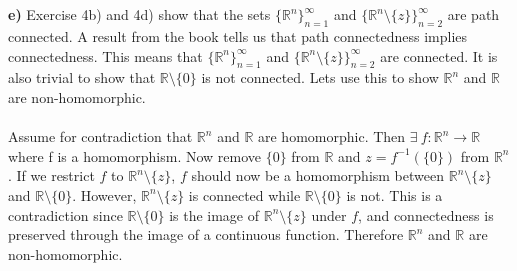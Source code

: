 \documentclass[11pt,a4paper]{report}
\begin{document}
\\
\\
\textbf{e)} Exercise 4b) and 4d) show that the sets $\{\mathbb{R}^n \}_{n=1}^{\infty}$ and $\{\mathbb{R}^n \setminus \{ z \}  \}_{n=2}^{\infty}$ are path connected. A result from the book tells us that path connectedness implies connectedness. This means that $\{\mathbb{R}^n \}_{n=1}^{\infty}$ and $\{\mathbb{R}^n \setminus \{ z \}  \}_{n=2}^{\infty}$ are connected. It is also trivial to show that $ \mathbb{R} \setminus \{0\}$ is not connected. Lets use this to show  $\mathbb{R}^n$ and $ \mathbb{R}$ are non-homomorphic.
\\
\\
Assume for contradiction that $\mathbb{R}^n$ and $ \mathbb{R}$ are homomorphic. Then $\exists \ f:\mathbb{R}^n \rightarrow \mathbb{R}$ where f is a homomorphism. Now remove $\{ 0\}$ from $ \mathbb{R}$ and $z=f^{-1}(\{ 0\})$ from $ \mathbb{R}^n$. If we restrict $f$ to $\mathbb{R}^n \setminus \{ z \}$, $f$ should now be a homomorphism between $\mathbb{R}^n \setminus \{ z \}$ and $\mathbb{R} \setminus \{0\}$. However, $\mathbb{R}^n \setminus \{ z \}$ is connected while $\mathbb{R} \setminus \{0\}$ is not. This is a contradiction since $\mathbb{R} \setminus \{0\}$ is the image of $\mathbb{R}^n \setminus \{ z \}$ under $f$, and connectedness is preserved through the image of a continuous function. Therefore $\mathbb{R}^n$ and $ \mathbb{R}$ are non-homomorphic.       
\end{document}
